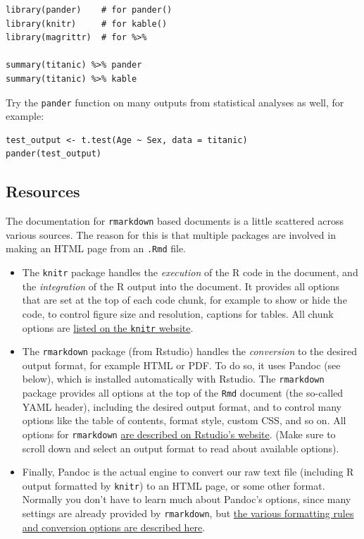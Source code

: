 \documentclass[]{book}
\providecommand{\tightlist}{%
  \setlength{\itemsep}{0pt}\setlength{\parskip}{0pt}}
\begin{document}
\begin{verbatim}
library(pander)    # for pander()
library(knitr)     # for kable()
library(magrittr)  # for %>%

summary(titanic) %>% pander
summary(titanic) %>% kable
\end{verbatim}

Try the \texttt{pander} function on many outputs from statistical analyses as well, for example:

\begin{verbatim}
test_output <- t.test(Age ~ Sex, data = titanic)
pander(test_output)
\end{verbatim}

\hypertarget{rmarkdownresources}{%
\subsection{Resources}\label{rmarkdownresources}}

The documentation for \texttt{rmarkdown} based documents is a little scattered across various sources. The reason for this is that multiple packages are involved in making an HTML page from an \texttt{.Rmd} file.

\begin{itemize}
\tightlist
\item
  The \texttt{knitr} package handles the \emph{execution} of the R code in the document, and the \emph{integration} of the R output into the document. It provides all options that are set at the top of each code chunk, for example to show or hide the code, to control figure size and resolution, captions for tables. All chunk options are \href{https://yihui.name/knitr/options/}{listed on the \texttt{knitr} website}.
\item
  The \texttt{rmarkdown} package (from Rstudio) handles the \emph{conversion} to the desired output format, for example HTML or PDF. To do so, it uses Pandoc (see below), which is installed automatically with Rstudio. The \texttt{rmarkdown} package provides all options at the top of the \texttt{Rmd} document (the so-called YAML header), including the desired output format, and to control many options like the table of contents, format style, custom CSS, and so on. All options for \texttt{rmarkdown} \href{https://rmarkdown.rstudio.com/}{are described on Rstudio's website}. (Make sure to scroll down and select an output format to read about available options).
\item
  Finally, Pandoc is the actual engine to convert our raw text file (including R output formatted by \texttt{knitr}) to an HTML page, or some other format. Normally you don't have to learn much about Pandoc's options, since many settings are already provided by \texttt{rmarkdown}, but \href{https://pandoc.org/MANUAL.html}{the various formatting rules and conversion options are described here}.
\end{itemize}
\end{document}
